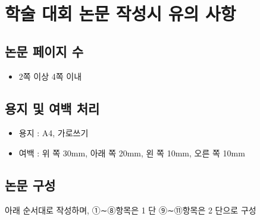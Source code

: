 \section{학술 대회 논문 작성시 유의 사항}

\subsection{논문 페이지 수}
\begin{itemize}[itemsep=0pt,parsep=0pt]
  \item 2쪽 이상 4쪽 이내 
\end{itemize}


\subsection{용지 및 여백 처리}
\begin{itemize}[itemsep=0pt,parsep=0pt]
  \item 용지 : A4, 가로쓰기
  \item 여백 : 위 쪽 30mm, 아래 쪽 20mm, 왼 쪽 10mm, 오른 쪽 10mm
\end{itemize}

\subsection{논문 구성}
아래 순서대로 작성하며, ①∼⑧항목은 1 단 ⑨∼⑪항목은 2 단으로 구성


